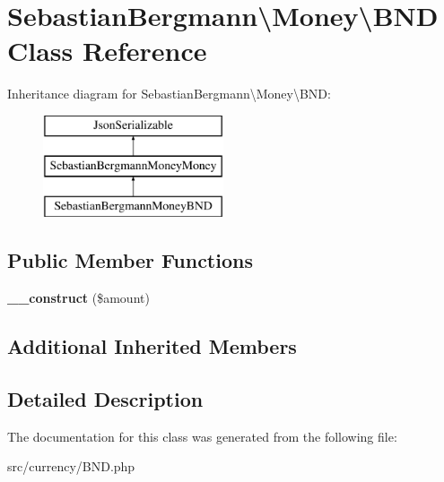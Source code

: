 \hypertarget{classSebastianBergmann_1_1Money_1_1BND}{}\section{Sebastian\+Bergmann\textbackslash{}Money\textbackslash{}B\+N\+D Class Reference}
\label{classSebastianBergmann_1_1Money_1_1BND}
Inheritance diagram for Sebastian\+Bergmann\textbackslash{}Money\textbackslash{}B\+N\+D\+:\begin{figure}[H]
\begin{center}
\leavevmode
\includegraphics[height=3.000000cm]{classSebastianBergmann_1_1Money_1_1BND}
\end{center}
\end{figure}
\subsection*{Public Member Functions}
\begin{DoxyCompactItemize}
\item 
\hypertarget{classSebastianBergmann_1_1Money_1_1BND_a46c3bf571f8d0c109c4db73c7db3ea6d}{}{\bfseries \+\_\+\+\_\+construct} (\$amount)\label{classSebastianBergmann_1_1Money_1_1BND_a46c3bf571f8d0c109c4db73c7db3ea6d}

\end{DoxyCompactItemize}
\subsection*{Additional Inherited Members}


\subsection{Detailed Description}


The documentation for this class was generated from the following file\+:\begin{DoxyCompactItemize}
\item 
src/currency/B\+N\+D.\+php\end{DoxyCompactItemize}
